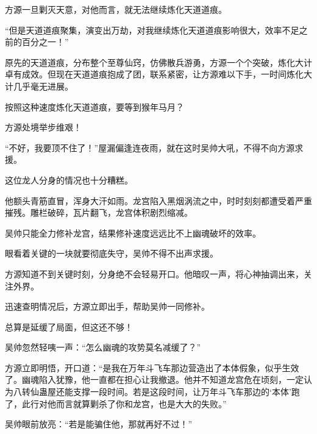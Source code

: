 \begin{this_body}
方源一旦剿灭天意，对他而言，就无法继续炼化天道道痕。

“但是天道道痕聚集，演变出万劫，对我继续炼化天道道痕影响很大，效率不足之前的百分之一！”

原先的天道道痕，分布整个至尊仙窍，仿佛散兵游勇，方源一个个突破，炼化大计卓有成效。但现在天道道痕抱成了团，联系紧密，让方源难以下手，一时间炼化大计几乎毫无进展。

按照这种速度炼化天道道痕，要等到猴年马月？

方源处境举步维艰！

“不好，我要顶不住了！”屋漏偏逢连夜雨，就在这时吴帅大吼，不得不向方源求援。

这位龙人分身的情况也十分糟糕。

他额头青筋直冒，浑身大汗如雨。龙宫陷入黑烟涡流之中，时时刻刻都遭受着严重摧残。雕栏破碎，瓦片翻飞，龙宫体积剧烈缩减。

吴帅只能全力修补龙宫，结果修补速度远远比不上幽魂破坏的效率。

眼看着关键的一块就要彻底失守，吴帅不得不出声求援。

方源知道不到关键时刻，分身绝不会轻易开口。他暗叹一声，将心神抽调出来，关注外界。

迅速查明情况后，方源立即出手，帮助吴帅一同修补。

总算是延缓了局面，但这还不够！

吴帅忽然轻咦一声：“怎么幽魂的攻势莫名减缓了？”

方源立即明悟，开口道：“是我在万年斗飞车那边营造出了本体假象，似乎生效了。幽魂陷入犹豫，他一直都在担心让我撤退。他并不知道龙宫危在顷刻，一定认为八转仙蛊屋还能支撑一段时间。若是这段时间，让万年斗飞车那边的‘本体’跑了，此行对他而言就算剿杀了你和龙宫，也是大大的失败。”

吴帅眼前放亮：“若是能骗住他，那就再好不过！”

\end{this_body}

